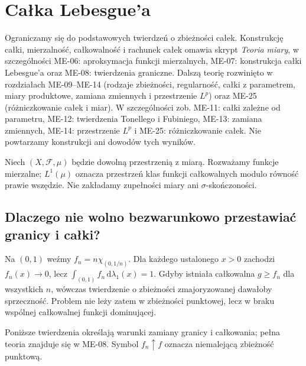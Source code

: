 \providecommand{\atlasref}[2]{#2}
\section{Całka Lebesgue'a}\label{ch:calkowanie-lebesgue}

Ograniczamy się do podstawowych twierdzeń o zbieżności całek.
Konstrukcję całki, mierzalność, całkowalność i rachunek całek
omawia skrypt \emph{Teoria miary}, w szczególności
\atlasref{ME-06::thm:simple-up}{ME-06: aproksymacja funkcji mierzalnych},
\atlasref{ME-07::ch:calkowanie-lebesgue}{ME-07: konstrukcja całki Lebesgue'a}
oraz \atlasref{ME-08::thm:mct}{ME-08: twierdzenia graniczne}.
Dalszą teorię rozwinięto w rozdziałach ME-09--ME-14
(rodzaje zbieżności, regularność, całki z parametrem,
miary produktowe, zamiana zmiennych i przestrzenie $L^p$)
oraz ME-25 (różniczkowanie całek i miar).
W szczególności zob.
\atlasref{ME-11::ch:parametry-calki}{ME-11: całki zależne od parametru},
\atlasref{ME-12::thm:fubini-12}{ME-12: twierdzenia Tonellego i Fubiniego},
\atlasref{ME-13::thm:change-variables-13}{ME-13: zamiana zmiennych},
\atlasref{ME-14::thm:riesz-fischer-14}{ME-14: przestrzenie $L^p$}
i \atlasref{ME-25::thm:lebesgue-diff-25}{ME-25: różniczkowanie całek}.
Nie powtarzamy konstrukcji ani dowodów tych wyników.

Niech $(X,\mathcal F,\mu)$ będzie dowolną przestrzenią z miarą.
Rozważamy funkcje mierzalne; $L^1(\mu)$ oznacza przestrzeń
klas funkcji całkowalnych modulo równość prawie wszędzie.
Nie zakładamy zupełności miary ani $\sigma$-skończoności.

\subsection{Dlaczego nie wolno bezwarunkowo przestawiać granicy i całki?}\label{ch:twierdzenia-graniczne}
\begin{przyklad}
Na $(0,1)$ weźmy
$f_n=n\chi_{(0,1/n)}$.
Dla każdego ustalonego $x>0$ zachodzi $f_n(x)\to0$,
lecz $\int_{(0,1)}f_n\,\mathrm d\lambda_1(x)=1$.
Gdyby istniała całkowalna $g\ge f_n$ dla wszystkich
$n$, wówczas twierdzenie o zbieżności zmajoryzowanej
dawałoby sprzeczność. Problem nie leży zatem
w zbieżności punktowej, lecz w braku wspólnej
całkowalnej funkcji dominującej.
\end{przyklad}

Poniższe twierdzenia określają warunki zamiany granicy
i całkowania; pełna teoria znajduje się w
\atlasref{ME-08::thm:mct}{ME-08}. Symbol $f_n\uparrow f$
oznacza niemalejącą zbieżność punktową.

